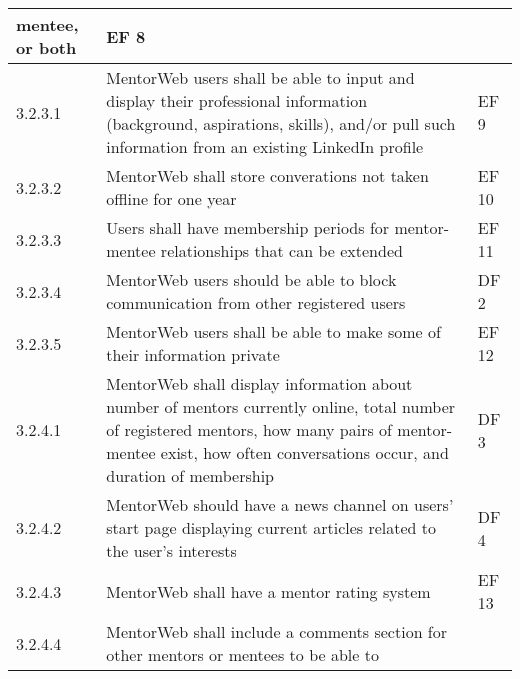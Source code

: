 \documentclass[11pt]{article}
\begin{document}
\begin{center}
\begin{longtable}{|l|p{8 cm}|l|}
                  mentee\index{Mentee}, or both           & EF 8  \\ \hline
        3.2.3.1 & MentorWeb\index{MentorWeb} users shall
                  be able to input and display their
                  professional information (background,
                  aspirations, skills), and/or pull such
                  information from an existing
                  LinkedIn\index{LinkedIn} profile       & EF 9  \\ \hline
        3.2.3.2 & MentorWeb\index{MentorWeb} shall store
                  converations\index{Conversation} not
                  taken offline for one year             & EF 10 \\ \hline
        3.2.3.3 & Users shall have membership periods for
                  mentor\index{Mentor}- mentee\index{Mentee}
                  relationships that can be extended     & EF 11 \\ \hline
        3.2.3.4 & MentorWeb\index{MentorWeb} users should
                  be able to block communication from
                  other registered users                 & DF 2  \\ \hline
        3.2.3.5 & MentorWeb\index{MentorWeb} users shall
                  be able to make some of their
                  information private                    & EF 12 \\ \hline
        3.2.4.1 & MentorWeb\index{MentorWeb} shall
                  display information about number of
                  mentors\index{Mentor} currently online,
                  total number of registered
                  mentors\index{Mentor}, how many pairs
                  of mentor\index{Mentor}-mentee\index{Mentee}
                  exist, how often
                  conversations\index{Conversation}
                  occur, and duration of membership     & DF 3  \\ \hline
        3.2.4.2 & MentorWeb\index{MentorWeb} should
                  have a news channel on users' start
                  page displaying current articles
                  related to the user's interests       & DF 4  \\ \hline
        3.2.4.3 & MentorWeb\index{MentorWeb} shall have
                  a mentor\index{Mentor}
                  rating\index{Rating} system           & EF 13 \\ \hline
        3.2.4.4 & MentorWeb\index{MentorWeb} shall
                  include a comments section for other
                  mentors\index{Mentor} or
                  mentees\index{Mentee} to be able to

\end{longtable}
\end{center}
\end{document}
